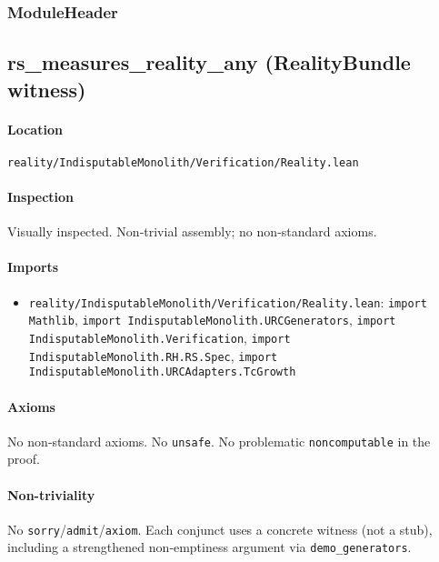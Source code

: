 \documentclass{article}
\newcommand{\FileRef}[1]{\texttt{#1}}
\newcommand{\ModuleHeader}[3]{%
  \subsection{#1}
  \paragraph{Location} \FileRef{#2}\\
  \paragraph{Inspection} #3
}
\begin{document}
\subsubsection{ModuleHeader}
\ModuleHeader{rs\_measures\_reality\_any (RealityBundle witness)}{reality/IndisputableMonolith/Verification/Reality.lean}{Visually inspected. Non‑trivial assembly; no non‑standard axioms.}

\paragraph{Imports}
\begin{itemize}[leftmargin=*]
  \item \FileRef{reality/IndisputableMonolith/Verification/Reality.lean}: \texttt{import Mathlib}, \texttt{import IndisputableMonolith.URCGenerators}, \texttt{import IndisputableMonolith.Verification}, \texttt{import IndisputableMonolith.RH.RS.Spec}, \texttt{import IndisputableMonolith.URCAdapters.TcGrowth}
\end{itemize}

\paragraph{Axioms}
No non‑standard axioms. No \texttt{unsafe}. No problematic \texttt{noncomputable} in the proof.

\paragraph{Non-triviality}
No \texttt{sorry}/\texttt{admit}/\texttt{axiom}. Each conjunct uses a concrete witness (not a stub), including a strengthened non‑emptiness argument via \texttt{demo\_generators}.
\end{document}
